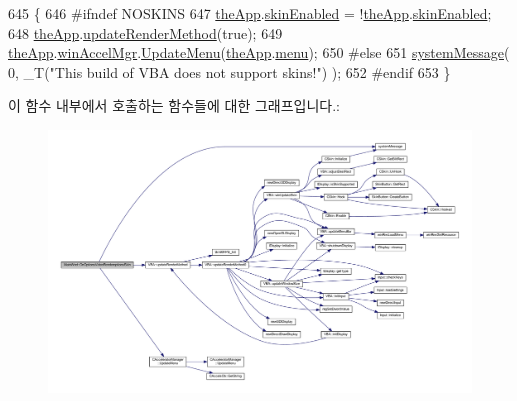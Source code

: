 \begin{DoxyCode}
645 \{
646 \textcolor{preprocessor}{#ifndef NOSKINS}
647   \mbox{\hyperlink{_v_b_a_8cpp_a8095a9d06b37a7efe3723f3218ad8fb3}{theApp}}.\mbox{\hyperlink{class_v_b_a_a5cc7dbf58210b127d9e807e8a3262829}{skinEnabled}} = !\mbox{\hyperlink{_v_b_a_8cpp_a8095a9d06b37a7efe3723f3218ad8fb3}{theApp}}.\mbox{\hyperlink{class_v_b_a_a5cc7dbf58210b127d9e807e8a3262829}{skinEnabled}};
648   \mbox{\hyperlink{_v_b_a_8cpp_a8095a9d06b37a7efe3723f3218ad8fb3}{theApp}}.\mbox{\hyperlink{class_v_b_a_a1d5b9c4597d5c565ce4d8ba1e594a89f}{updateRenderMethod}}(\textcolor{keyword}{true});
649   \mbox{\hyperlink{_v_b_a_8cpp_a8095a9d06b37a7efe3723f3218ad8fb3}{theApp}}.\mbox{\hyperlink{class_v_b_a_ad7ebce057dbde0ca88cee75e84721a89}{winAccelMgr}}.\mbox{\hyperlink{class_c_accelerator_manager_ac7411d20f413ea0ec3bd65705b564adf}{UpdateMenu}}(\mbox{\hyperlink{_v_b_a_8cpp_a8095a9d06b37a7efe3723f3218ad8fb3}{theApp}}.\mbox{\hyperlink{class_v_b_a_acf9d855b5b959a2df9c6cb21b888366e}{menu}});
650 \textcolor{preprocessor}{#else}
651     \mbox{\hyperlink{system_8cpp_a747a9cb8e015a3d45cca636b5bd0fc69}{systemMessage}}( 0, \_T(\textcolor{stringliteral}{"This build of VBA does not support skins!"}) );
652 \textcolor{preprocessor}{#endif}
653 \}
\end{DoxyCode}
이 함수 내부에서 호출하는 함수들에 대한 그래프입니다.\+:
\nopagebreak
\begin{figure}[H]
\begin{center}
\leavevmode
\includegraphics[width=350pt]{class_main_wnd_a5f44893bd6c5452bbd514c034ee15fbd_cgraph}
\end{center}
\end{figure}
\mbox{\label{class_main_wnd_a3d08e3bf2be9dee73c57674e4a6d890e}} 
